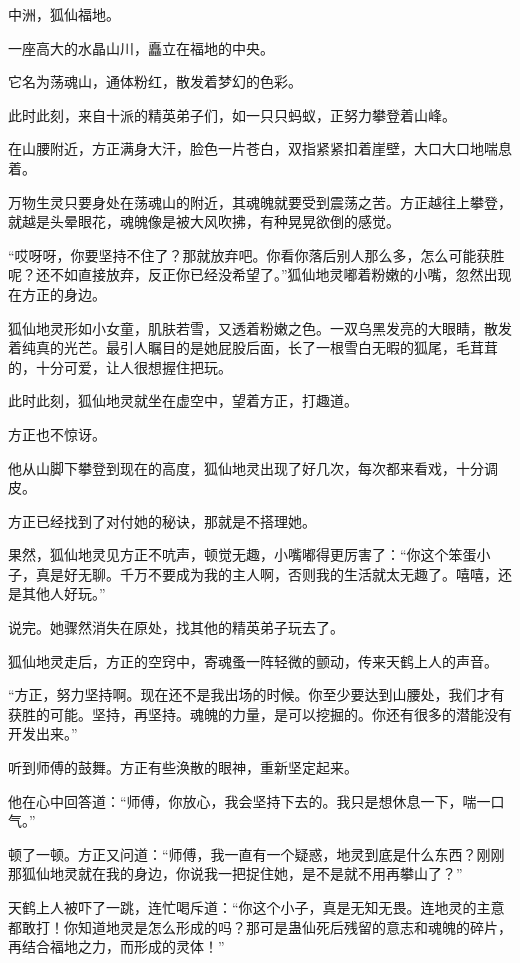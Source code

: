 
\begin{this_body}

中洲，狐仙福地。

一座高大的水晶山川，矗立在福地的中央。

它名为荡魂山，通体粉红，散发着梦幻的色彩。

此时此刻，来自十派的精英弟子们，如一只只蚂蚁，正努力攀登着山峰。

在山腰附近，方正满身大汗，脸色一片苍白，双指紧紧扣着崖壁，大口大口地喘息着。

万物生灵只要身处在荡魂山的附近，其魂魄就要受到震荡之苦。方正越往上攀登，就越是头晕眼花，魂魄像是被大风吹拂，有种晃晃欲倒的感觉。

“哎呀呀，你要坚持不住了？那就放弃吧。你看你落后别人那么多，怎么可能获胜呢？还不如直接放弃，反正你已经没希望了。”狐仙地灵嘟着粉嫩的小嘴，忽然出现在方正的身边。

狐仙地灵形如小女童，肌肤若雪，又透着粉嫩之色。一双乌黑发亮的大眼睛，散发着纯真的光芒。最引人瞩目的是她屁股后面，长了一根雪白无暇的狐尾，毛茸茸的，十分可爱，让人很想握住把玩。

此时此刻，狐仙地灵就坐在虚空中，望着方正，打趣道。

方正也不惊讶。

他从山脚下攀登到现在的高度，狐仙地灵出现了好几次，每次都来看戏，十分调皮。

方正已经找到了对付她的秘诀，那就是不搭理她。

果然，狐仙地灵见方正不吭声，顿觉无趣，小嘴嘟得更厉害了：“你这个笨蛋小子，真是好无聊。千万不要成为我的主人啊，否则我的生活就太无趣了。嘻嘻，还是其他人好玩。”

说完。她骤然消失在原处，找其他的精英弟子玩去了。

狐仙地灵走后，方正的空窍中，寄魂蚤一阵轻微的颤动，传来天鹤上人的声音。

“方正，努力坚持啊。现在还不是我出场的时候。你至少要达到山腰处，我们才有获胜的可能。坚持，再坚持。魂魄的力量，是可以挖掘的。你还有很多的潜能没有开发出来。”

听到师傅的鼓舞。方正有些涣散的眼神，重新坚定起来。

他在心中回答道：“师傅，你放心，我会坚持下去的。我只是想休息一下，喘一口气。”

顿了一顿。方正又问道：“师傅，我一直有一个疑惑，地灵到底是什么东西？刚刚那狐仙地灵就在我的身边，你说我一把捉住她，是不是就不用再攀山了？”

天鹤上人被吓了一跳，连忙喝斥道：“你这个小子，真是无知无畏。连地灵的主意都敢打！你知道地灵是怎么形成的吗？那可是蛊仙死后残留的意志和魂魄的碎片，再结合福地之力，而形成的灵体！”


\end{this_body}
